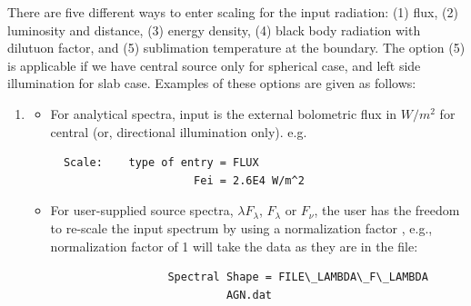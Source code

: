 \documentclass[11pt]{article}
\begin{document}
There are five different ways to enter scaling for the input radiation:
(1) flux, (2) luminosity and distance, (3) energy density, (4) black body radiation
with dilutuon factor, and (5) sublimation temperature at the boundary. The option (5)
is applicable if we have central source only for spherical case, and left side
illumination for slab case. Examples of these  options are given as follows:
%
\begin{enumerate}
%
\item
\begin{itemize}
%
\item
For analytical spectra, input is the external bolometric flux in $W/m^2$ for central
(or, directional illumination only). e.g.
\begin{verbatim}
  Scale:    type of entry = FLUX
                      Fei = 2.6E4 W/m^2
\end{verbatim}
%
\item
For user-supplied source spectra, $\lambda F_{\lambda}$, $F_{\lambda}$ or $F_{\nu}$, the user
has the freedom to re-scale the input spectrum by using a normalization factor , e.g., normalization
factor of 1 will take the data as they are in the file:
%
\begin{verbatim}
                  Spectral Shape = FILE\_LAMBDA\_F\_LAMBDA
                           AGN.dat


\end{verbatim}
\end{itemize}
\end{enumerate}
\end{document}
